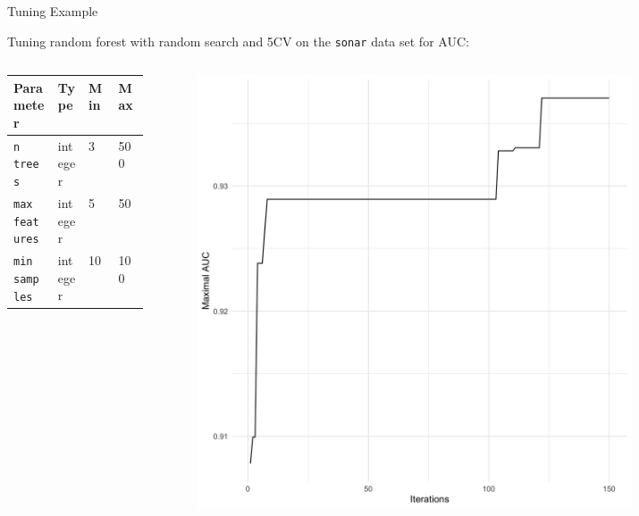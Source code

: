 \begin{frame}{Tuning Example}

Tuning random forest with random search and 5CV on the \texttt{sonar} data set for AUC:



\begin{columns}
\begin{column}{0.49\textwidth}
\begin{center}
\begin{tabular}{|l|l|l|l}
Parameter&Type & Min & Max \\
\hline
\texttt{n trees} & integer& 3 & 500 \\
\texttt{max features}& integer& 5 & 50\\
\texttt{min samples} & integer& 10 & 100\\
\end{tabular}
\end{center}
\end{column}
\begin{column}{0.49\textwidth}
\begin{center}
\begin{figure}
\includegraphics[width=0.8\textwidth]{images/curve.png}
\end{figure}
\end{center}
\end{column}
\end{columns}


\end{frame}




